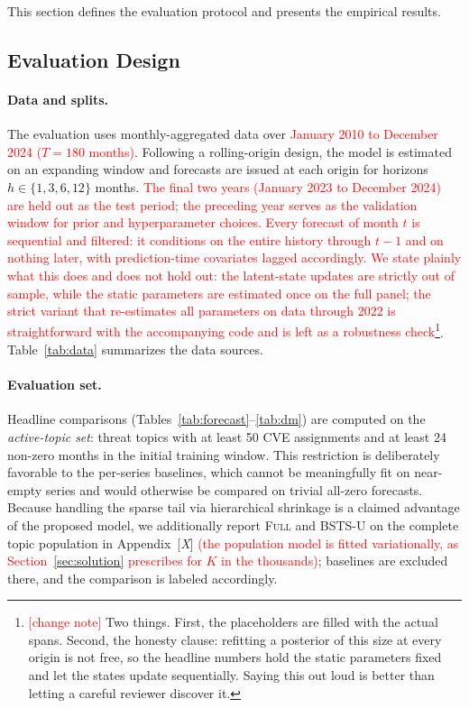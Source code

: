 \documentclass[review]{elsarticle}
\newcommand{\rev}[1]{\textcolor{red}{#1}}
\newcommand{\revnote}[2]{\textcolor{red}{#1}\footnote{\textcolor{red}{[change note]} #2}}
\newcommand{\rev}[1]{#1}
\newcommand{\revnote}[2]{#1}
\begin{document}
This section defines the evaluation protocol and presents the empirical results.

\subsection{Evaluation Design}

\paragraph{Data and splits.}
The evaluation uses monthly-aggregated data over \rev{January 2010 to December 2024 ($T = 180$ months)}. Following a rolling-origin design, the model is estimated on an expanding window and forecasts are issued at each origin for horizons $h \in \{1, 3, 6, 12\}$ months. \revnote{The final two years (January 2023 to December 2024) are held out as the test period; the preceding year serves as the validation window for prior and hyperparameter choices. Every forecast of month $t$ is sequential and filtered: it conditions on the entire history through $t-1$ and on nothing later, with prediction-time covariates lagged accordingly. We state plainly what this does and does not hold out: the latent-state updates are strictly out of sample, while the static parameters are estimated once on the full panel; the strict variant that re-estimates all parameters on data through 2022 is straightforward with the accompanying code and is left as a robustness check}{Two things. First, the placeholders are filled with the actual spans. Second, the honesty clause: refitting a posterior of this size at every origin is not free, so the headline numbers hold the static parameters fixed and let the states update sequentially. Saying this out loud is better than letting a careful reviewer discover it.}. Table~\ref{tab:data} summarizes the data sources.

\paragraph{Evaluation set.}
Headline comparisons (Tables~\ref{tab:forecast}--\ref{tab:dm}) are computed on the \emph{active-topic set}: threat topics with at least 50 CVE assignments and at least 24 non-zero months in the initial training window. This restriction is deliberately favorable to the per-series baselines, which cannot be meaningfully fit on near-empty series and would otherwise be compared on trivial all-zero forecasts. Because handling the sparse tail via hierarchical shrinkage is a claimed advantage of the proposed model, we additionally report \textsc{Full} and \textsc{BSTS-U} on the complete topic population in Appendix~[\emph{X}]\rev{ (the population model is fitted variationally, as Section~\ref{sec:solution} prescribes for $K$ in the thousands)}; baselines are excluded there, and the comparison is labeled accordingly.
\end{document}

